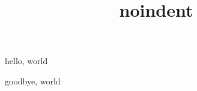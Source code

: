 \documentclass{amsart}
\title{noindent}
\begin{document}
\maketitle

hello, world

\noindent goodbye, world
\end{document}
